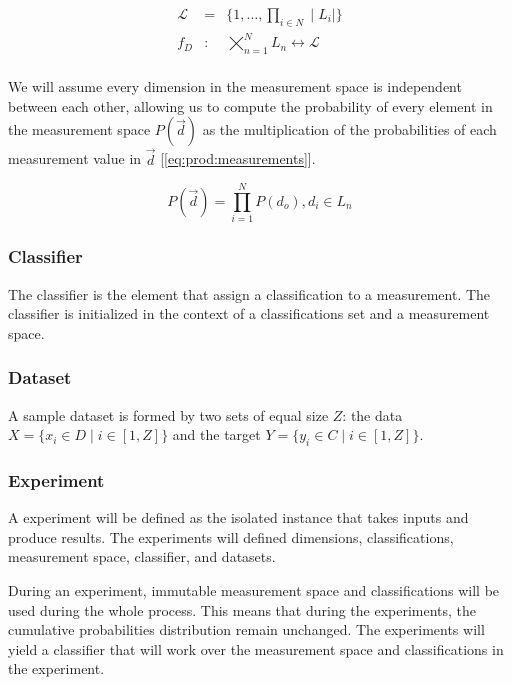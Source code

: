 \documentclass[letterpaper, conference]{IEEEtran}
\begin{document}
\begin{equation}\label{eq:linear-address}
  \begin{aligned}
  \mathcal{L} &=& \{1, \dots, \prod_{i \in N} \mid L_i \mid\} \\
  f_D&:& \bigtimes_{n=1}^{N} L_n \longleftrightarrow \mathcal{L} \\
  \end{aligned}
\end{equation}

We will assume every dimension in the measurement space is independent between each other, allowing us to compute the probability of every element in the measurement space $P(\vec{d})$ as the multiplication of the probabilities of each measurement value in $\vec{d}$ [\ref{eq:prod:measurements}].

\begin{equation}\label{eq:prod:measurements}
  P(\vec{d}) = \prod_{i = 1}^{N} P(d_o), d_i \in L_n
\end{equation}

\subsubsection{Classifier}
The classifier is the element that assign a classification to a measurement. The classifier is initialized in the context of a classifications set and a measurement space.

\subsubsection{Dataset}
A sample dataset is formed by two sets of equal size $Z$: the data $ X = \{x_i \in D \mid i \in [1, Z]\}$ and the target $Y = \{ y_i \in C \mid i \in [1, Z]\}$.

\subsubsection{Experiment}
A experiment will be defined as the isolated instance that takes inputs and produce results. The experiments will defined dimensions, classifications, measurement space, classifier, and datasets.

During an experiment, immutable measurement space and classifications will be used during the whole process. This means that during the experiments, the cumulative probabilities distribution remain unchanged. The experiments will yield a classifier that will work over the measurement space and classifications in the experiment.
\end{document}
